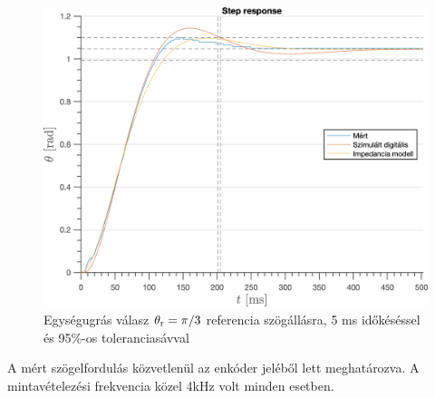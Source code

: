 \begin{figure}[b!]
    \begin{center}
    \includegraphics[width=\textwidth]{images/step_response_experiment0005.png}
    \caption{Egységugrás válasz \(\theta_{\mathrm{r}} = \pi/3\) referencia szögállásra, 5 ms időkéséssel és 95\%-os toleranciasávval}\label{fig:step_response_experiment0005}
    \end{center}
\end{figure}

A mért szögelfordulás közvetlenül az enkóder jeléből lett meghatározva. A mintavételezési frekvencia közel 4kHz volt 
minden esetben. 

